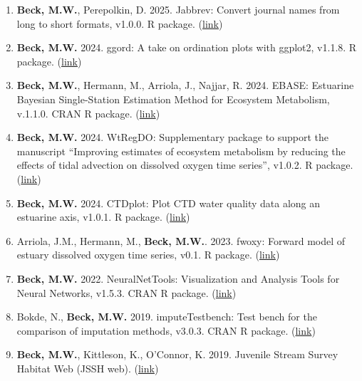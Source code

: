 \documentclass[letterpaper,12pt]{article}
\begin{document}
\begin{enumerate}
\item \textbf{Beck, M.W.}, Perepolkin, D. 2025. Jabbrev: Convert journal names from long to short formats, v1.0.0. R package. ({\footnotesize\href{https://github.com/fawda123/Jabbrev}{link}})

\item \textbf{Beck, M.W.} 2024. ggord: A take on ordination plots with ggplot2, v1.1.8. R package. ({\footnotesize\href{https://fawda123.github.io/ggord/}{link}})

\item \textbf{Beck, M.W.}, Hermann, M., Arriola, J., Najjar, R. 2024. EBASE: Estuarine Bayesian Single-Station Estimation Method for Ecosystem Metabolism, v.1.1.0. CRAN R package. ({\footnotesize\href{https://fawda123.github.io/EBASE/}{link}})

\item \textbf{Beck, M.W.} 2024. WtRegDO: Supplementary package to support the manuscript ``Improving estimates of ecosystem metabolism by reducing the effects of tidal advection on dissolved oxygen time series'', v1.0.2. R package. ({\footnotesize\href{http://github.com/fawda123/WtRegDO}{link}})

\item \textbf{Beck, M.W.} 2024. CTDplot: Plot CTD water quality data along an estuarine axis, v1.0.1. R package. ({\footnotesize\href{https://github.com/fawda123/CTDplot}{link}})

\item Arriola, J.M., Hermann, M., \textbf{Beck, M.W.}. 2023. fwoxy: Forward model of estuary dissolved oxygen time series, v0.1. R package. ({\footnotesize\href{https://github.com/jmarriola/fwoxy}{link}}) 

\item \textbf{Beck, M.W.} 2022. NeuralNetTools: Visualization and Analysis Tools for Neural Networks, v1.5.3. CRAN R package. ({\footnotesize\href{http://cran.r-project.org/web/packages/NeuralNetTools/}{link}})

\item Bokde, N., \textbf{Beck, M.W.} 2019. imputeTestbench: Test bench for the comparison of imputation methods, v3.0.3. CRAN R package. ({\footnotesize\href{https://cran.r-project.org/web/packages/imputeTestbench/index.html}{link}})

\item \textbf{Beck, M.W.}, Kittleson, K., O'Connor, K. 2019. Juvenile Stream Survey Habitat Web (JSSH web). ({\footnotesize\href{https://sccwrp.shinyapps.io/jssh_web/}{link}})


\end{enumerate}
\end{document}
